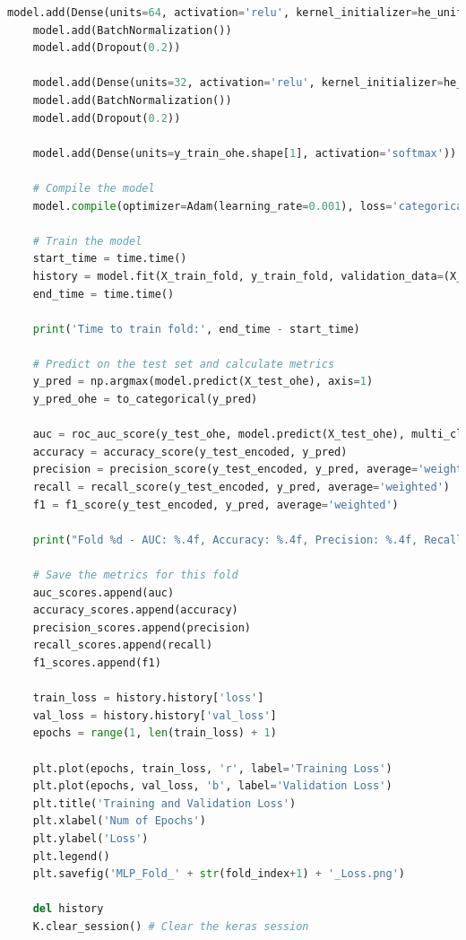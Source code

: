 \begin{appendices}
\begin{lstlisting}[language=Python]
    model.add(Dense(units=64, activation='relu', kernel_initializer=he_uniform()))
    model.add(BatchNormalization())
    model.add(Dropout(0.2))
    
    model.add(Dense(units=32, activation='relu', kernel_initializer=he_uniform()))
    model.add(BatchNormalization())
    model.add(Dropout(0.2))
    
    model.add(Dense(units=y_train_ohe.shape[1], activation='softmax'))

    # Compile the model 
    model.compile(optimizer=Adam(learning_rate=0.001), loss='categorical_crossentropy', metrics=[AUC()])
    
    # Train the model
    start_time = time.time()
    history = model.fit(X_train_fold, y_train_fold, validation_data=(X_val_fold, y_val_fold), callbacks=[early_stopping], batch_size=200, epochs=20)
    end_time = time.time()
    
    print('Time to train fold:', end_time - start_time)
    
    # Predict on the test set and calculate metrics
    y_pred = np.argmax(model.predict(X_test_ohe), axis=1)
    y_pred_ohe = to_categorical(y_pred)
    
    auc = roc_auc_score(y_test_ohe, model.predict(X_test_ohe), multi_class='ovr')
    accuracy = accuracy_score(y_test_encoded, y_pred)
    precision = precision_score(y_test_encoded, y_pred, average='weighted')
    recall = recall_score(y_test_encoded, y_pred, average='weighted')
    f1 = f1_score(y_test_encoded, y_pred, average='weighted')
    
    print("Fold %d - AUC: %.4f, Accuracy: %.4f, Precision: %.4f, Recall: %.4f, F1: %.4f" % (fold_index+1, auc, accuracy, precision, recall, f1))
    
    # Save the metrics for this fold
    auc_scores.append(auc)
    accuracy_scores.append(accuracy)
    precision_scores.append(precision)
    recall_scores.append(recall)
    f1_scores.append(f1)

    train_loss = history.history['loss']
    val_loss = history.history['val_loss']
    epochs = range(1, len(train_loss) + 1)

    plt.plot(epochs, train_loss, 'r', label='Training Loss')
    plt.plot(epochs, val_loss, 'b', label='Validation Loss')
    plt.title('Training and Validation Loss')
    plt.xlabel('Num of Epochs')
    plt.ylabel('Loss')
    plt.legend()
    plt.savefig('MLP_Fold_' + str(fold_index+1) + '_Loss.png')
    
    del history
    K.clear_session() # Clear the keras session


\end{lstlisting}
\end{appendices}
